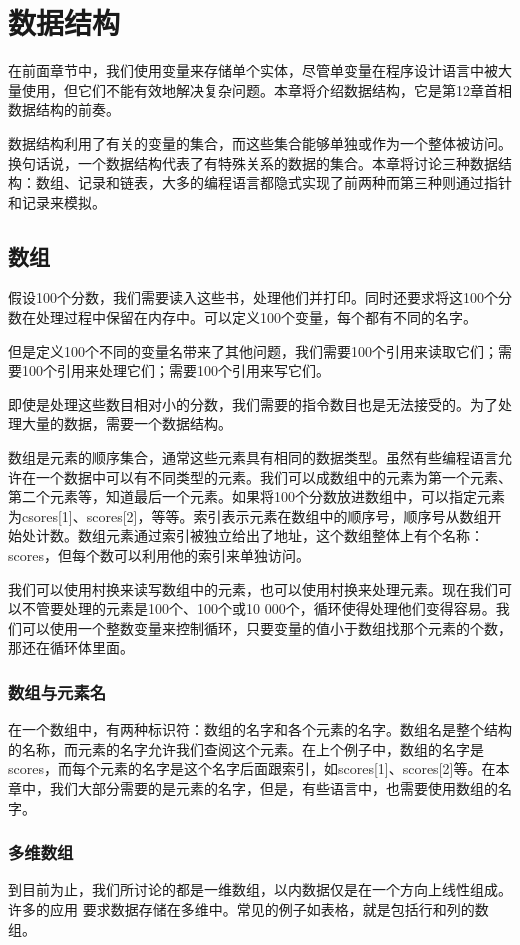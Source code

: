 \chapter{数据结构}
在前面章节中，我们使用变量来存储单个实体，尽管单变量在程序设计语言中被大量使用，但它们不能有效地解决复杂问题。本章将介绍数据结构，它是第12章首相数据结构的前奏。

数据结构利用了有关的变量的集合，而这些集合能够单独或作为一个整体被访问。换句话说，一个数据结构代表了有特殊关系的数据的集合。本章将讨论三种数据结构：数组、记录和链表，大多的编程语言都隐式实现了前两种而第三种则通过指针和记录来模拟。
\section{数组}
假设100个分数，我们需要读入这些书，处理他们并打印。同时还要求将这100个分数在处理过程中保留在内存中。可以定义100个变量，每个都有不同的名字。

但是定义100个不同的变量名带来了其他问题，我们需要100个引用来读取它们；需要100个引用来处理它们；需要100个引用来写它们。

即使是处理这些数目相对小的分数，我们需要的指令数目也是无法接受的。为了处理大量的数据，需要一个数据结构。

数组是元素的顺序集合，通常这些元素具有相同的数据类型。虽然有些编程语言允许在一个数据中可以有不同类型的元素。我们可以成数组中的元素为第一个元素、第二个元素等，知道最后一个元素。如果将100个分数放进数组中，可以指定元素为csores[1]、scores[2]，等等。索引表示元素在数组中的顺序号，顺序号从数组开始处计数。数组元素通过索引被独立给出了地址，这个数组整体上有个名称：scores，但每个数可以利用他的索引来单独访问。

我们可以使用村换来读写数组中的元素，也可以使用村换来处理元素。现在我们可以不管要处理的元素是100个、100个或10 000个，循环使得处理他们变得容易。我们可以使用一个整数变量来控制循环，只要变量的值小于数组找那个元素的个数，那还在循环体里面。
\subsection{数组与元素名}
在一个数组中，有两种标识符：数组的名字和各个元素的名字。数组名是整个结构的名称，而元素的名字允许我们查阅这个元素。在上个例子中，数组的名字是scores，而每个元素的名字是这个名字后面跟索引，如scores[1]、scores[2]等。在本章中，我们大部分需要的是元素的名字，但是，有些语言中，也需要使用数组的名字。
\subsection{多维数组}
到目前为止，我们所讨论的都是一维数组，以内数据仅是在一个方向上线性组成。许多的应用 要求数据存储在多维中。常见的例子如表格，就是包括行和列的数组。

